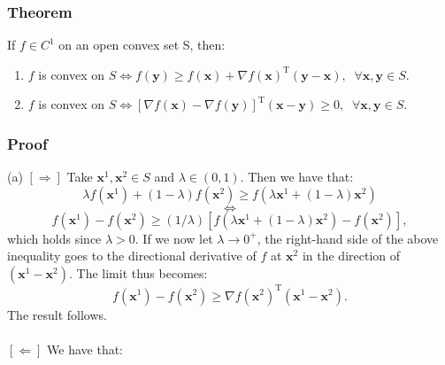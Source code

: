 \documentclass[12pt, a4paper]{article}
\begin{document}
\subsubsection*{Theorem}
If $f \in C^1$ on an open convex set S, then:
\begin{enumerate}[label={(\alph*)}]
    \item $f$ is convex on $S \Leftrightarrow f(\bm{y}) \geq f(\bm{x}) + \nabla f(\bm{x})^\text{T}(\bm{y-x}),\;\; \forall \bm{x,y}\in S$.
    \item $f$ is convex on $S \Leftrightarrow [\nabla f(\bm{x})-\nabla f(\bm{y})]^{\text{T}}(\bm{x-y})\geq 0,\;\; \forall \bm{x,y}\in S$.
\end{enumerate}
\subsubsection*{Proof}
(a) $[\Rightarrow]$ Take $\bm{x}^1,\bm{x}^2 \in S$ and $\lambda \in (0,1)$. Then we have that:
\[
    \lambda f(\bm{x}^1)+(1-\lambda)f(\bm{x}^2) \geq f(\lambda \bm{x}^1 + (1-\lambda) \bm{x}^2)
\]
\[
    \Leftrightarrow
\]
\[
    f(\bm{x}^1) - f(\bm{x}^2) \geq (1/\lambda)[f(\lambda \bm{x}^1 + (1-\lambda)\bm{x}^2) - f(\bm{x}^2)],
\]
which holds since $\lambda>0$. If we now let $\lambda \rightarrow 0^+$, the right-hand side of the above inequality goes to the directional derivative of $f$ at $\bm{x}^2$ in the direction of $(\bm{x}^1-\bm{x}^2)$. The limit thus becomes:
\begin{equation*}
f(\bm{x}^1) - f(\bm{x}^2) \geq \nabla f(\bm{x}^2)^{\text{T}}(\bm{x}^1-\bm{x}^2).
\end{equation*}
The result follows.
\\\\
$[\Leftarrow]$ We have that:
\end{document}
